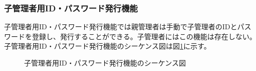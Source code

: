 \documentclass[a4j]{jarticle}
\begin{document}
 \subsubsection{子管理者用ID・パスワード発行機能}
 子管理者用ID・パスワード発行機能では親管理者は手動で子管理者のIDとパスワードを登録し、発行することができる。子管理者にはこの機能は存在しない。子管理者用ID・パスワード発行機能のシーケンス図は図\ref{fig:admin_children_id-pass.png}に示す。
         \begin{figure}[H]
\centering
{}
\caption{子管理者用ID・パスワード発行機能のシーケンス図}
\label{fig:admin_children_id-pass.png}
\end{figure}
 
\end{document}
